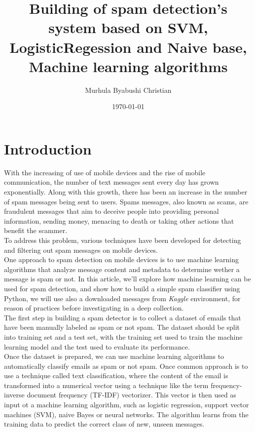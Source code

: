 \documentclass[12pt,a4paper]{article}
\title{\textbf{Building of spam detection's system based on SVM, LogisticRegession and Naive base, Machine learning algorithms}}
\author{Murhula Byabushi Christian}
\date{\today}
\begin{document}
	\maketitle  
	\newpage
	\listoffigures
	\tableofcontents
	\newpage
		
\part{Introduction}  
With the increasing of use of mobile devices and the rise of mobile communication, the number of text messages sent every day has grown exponentially. Along with this growth, there has been an increase in the number of spam messages being sent to users. Spams messages, also known as scams, are fraudulent messages that aim to deceive people into providing personal information, sending money, menacing to death or taking other actions that benefit the scammer.  \\

To address this problem, various techniques have been developed for detecting and filtering out spam messages on mobile devices. \\
One approach to spam detection on mobile devices is to use machine learning algorithms that analyze message content and metadata to determine wether a message is spam or not. In this article, we'll explore how machine learning can be used for spam detection, and show how to build a simple spam classifier using Python, we will use also a downloaded messages from \textit{Kaggle} environment, for reason of practices before investigating in a deep collection.\\ 

The first step in building a spam detector is to collect a dataset of emails that have been manually labeled as spam or not spam. The dataset should be split into training set and a test set, with the training set used to train the machine learning model and the test used to evaluate its performance.\\
Once the dataset is prepared, we can use machine learning algorithms to automatically classify emails as spam or not spam. Once common approach is to use a technique called text classification, where the content of the email is transformed into a numerical vector using a technique like the term frequency-inverse document frequency (TF-IDF) vectorizer. This vector is then used as input ot a machine learning algorithm, such as logistic regression, support vector machines (SVM), naive Bayes or neural networks. The algorithm learns from the training data to predict the correct class of new, unseen messages. 
\\
\end{document}
